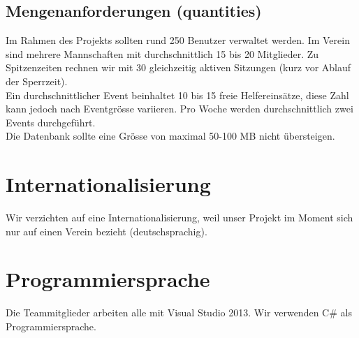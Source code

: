 	\subsection{Mengenanforderungen (quantities)}
	Im Rahmen des Projekts sollten rund 250 Benutzer verwaltet werden. Im Verein sind mehrere Mannschaften mit durchschnittlich 15 bis 20 Mitglieder. 
	Zu Spitzenzeiten rechnen wir mit 30 gleichzeitig aktiven Sitzungen (kurz vor Ablauf der Sperrzeit). \\Ein durchschnittlicher Event beinhaltet 10 bis 15 freie Helfereinsätze, diese Zahl kann jedoch nach Eventgrösse variieren. Pro Woche werden durchschnittlich zwei Events durchgeführt.
	\\Die Datenbank sollte eine Grösse von maximal 50-100 MB nicht übersteigen.
	
	
	\section{Internationalisierung}
	Wir verzichten auf eine Internationalisierung, weil unser Projekt im Moment sich nur auf einen Verein bezieht (deutschsprachig).
	
	\section{Programmiersprache}
	Die Teammitglieder arbeiten alle mit Visual Studio 2013. Wir verwenden C\# als Programmiersprache. 

	

